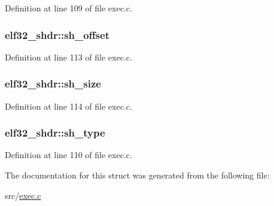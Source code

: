 Definition at line 109 of file exec.\+c.

\hypertarget{structelf32__shdr_a4dea3a6fbd3a62a649d327b515c70cd6}{
\subsubsection[{sh\+\_\+offset}]{ elf32\+\_\+shdr\+::sh\+\_\+offset}}\label{structelf32__shdr_a4dea3a6fbd3a62a649d327b515c70cd6}


Definition at line 113 of file exec.\+c.

\hypertarget{structelf32__shdr_a4addb97e16e7303912fc84daa6f3ac77}{
\subsubsection[{sh\+\_\+size}]{ elf32\+\_\+shdr\+::sh\+\_\+size}}\label{structelf32__shdr_a4addb97e16e7303912fc84daa6f3ac77}


Definition at line 114 of file exec.\+c.

\hypertarget{structelf32__shdr_ab82e07582eb07fc53eec4dca36dddc83}{
\subsubsection[{sh\+\_\+type}]{ elf32\+\_\+shdr\+::sh\+\_\+type}}\label{structelf32__shdr_ab82e07582eb07fc53eec4dca36dddc83}


Definition at line 110 of file exec.\+c.



The documentation for this struct was generated from the following file\+:\begin{DoxyCompactItemize}
\item 
src/\hyperlink{exec_8c}{exec.\+c}\end{DoxyCompactItemize}

